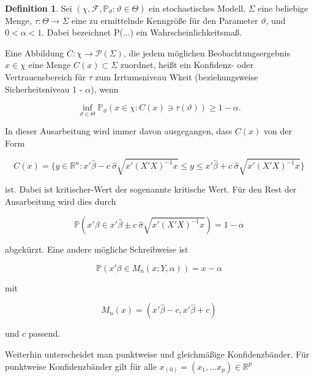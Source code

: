 \documentclass[12pt,a4paper]{article}
\theoremstyle{definition}
\newtheorem{Definition}{Definition}[subsection]
\theoremstyle{definition}
\theoremstyle{definition}
\theoremstyle{definition}
\begin{document}
\begin{Definition}
Sei $( \chi, \mathscr{F} , \mathbb{P}_\vartheta : \vartheta \in \Theta) $ ein stochastisches Modell, $\Sigma$ eine beliebige Menge, $\tau : \Theta \rightarrow \Sigma $ eine zu ermittelnde Kenngröße für den Parameter $\vartheta$, und $0 < \alpha < 1$. Dabei bezeichnet \gls{P(...)} ein Wahrscheinlichkeitsmaß.

Eine Abbildung $C : \chi \rightarrow \mathscr{P}(\Sigma)$, die jedem möglichen Beobachtungsergebnis $x \in \chi$ eine Menge $C(x) \subset \Sigma$ zuordnet, heißt ein Konfidenz- oder Vertrauensbereich für $\tau$ zum Irrtumsniveau \gls{Wkeit} (beziehungsweise Sicherheitsniveau 1 - $\alpha$), wenn

\begin{equation*}
\inf_{\vartheta \in \Theta} \mathbb{P}_{\vartheta}(x \in \chi : C(x) \ni \tau(\vartheta)) \geq 1 - \alpha.
\end{equation*}

\end{Definition}

In dieser Ausarbeitung wird immer davon ausgegangen, dass $C(x)$ von der Form 

\begin{equation*}
C(x) = \Big \{ y \in \mathbb{R}^n :  x'\hat{\beta} - c ~ \hat{\sigma}\sqrt{x'(X'X)^{-1}x} \leq y \leq x'\hat{\beta} + c ~ \hat{\sigma}\sqrt{x'(X'X)^{-1}x} \Big \}
\end{equation*}

ist. Dabei ist \gls{kritischer-Wert} der sogenannte kritische Wert. Für den Rest der Ausarbeitung wird dies durch

\begin{equation*}
\mathbb{P} \left( x' \beta \in x'\hat{\beta} \pm c ~ \hat{\sigma}\sqrt{x'(X'X)^{-1}x} \right) = 1 - \alpha
\end{equation*} 

abgekürzt. Eine andere mögliche Schreibweise ist 

\begin{equation*}
\mathbb{P}(x'\beta \in M_n(x;Y,\alpha)) = x - \alpha
\end{equation*}

mit 

\begin{equation*}
M_n(x) = (x'\hat{\beta} -c, x'\hat{\beta} +c) 
\end{equation*}

und $c$ passend.

Weiterhin unterscheidet man punktweise und gleichmäßige Konfidenzbänder. Für punktweise Konfidenzbänder gilt für alle $x_{(0)} = (x_{1}, \ldots x_{p}) \in \mathbb{R}^p$
\end{document}
